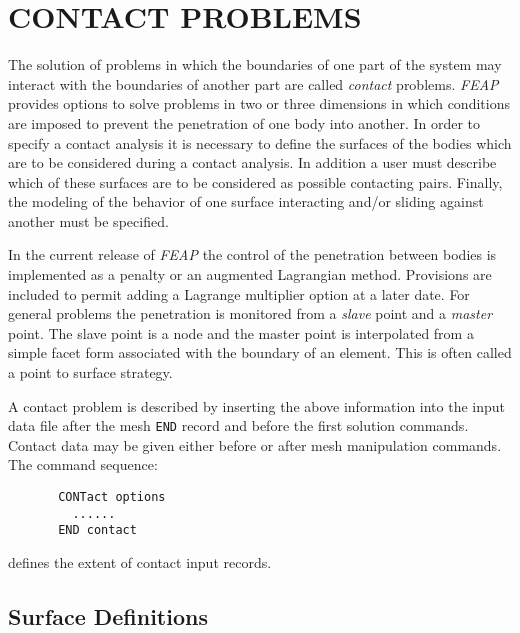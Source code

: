 \chapter[Contact]{CONTACT PROBLEMS}
\label{contact}

The solution of problems in which the boundaries of one part of the
system may interact with the boundaries of another part are called
{\it contact} problems.  {\sl FEAP} provides options to solve problems
in two or three dimensions in which conditions are imposed to prevent
the penetration of one body into another.  In order to specify a
contact analysis it is necessary to define the surfaces of the bodies
which are to be considered during a contact analysis.  In addition a
user must describe which of these surfaces are to be considered as 
possible contacting pairs.  Finally, the modeling of the behavior of
one surface interacting and/or sliding against another must be specified.

In the current release of {\sl FEAP} the control of the penetration
between bodies is implemented as a penalty or an augmented Lagrangian
method.  Provisions are included to permit adding a Lagrange multiplier
option at a later date.  For general problems the penetration is monitored
from a {\it slave} point and a {\it master} point.  The slave point is
a node and the master point is interpolated from a simple facet form
associated with the boundary of an element.  This is often called a point
to surface strategy.

A contact problem is described by inserting the above information
into the input data file after the mesh {\tt END} record and before
the first solution commands.  Contact data may be given either before
or after mesh manipulation commands.  The command sequence:
\begin{verbatim}
       CONTact options
         ......
       END contact
\end{verbatim}
defines the extent of contact input records.

\section{Surface Definitions}

